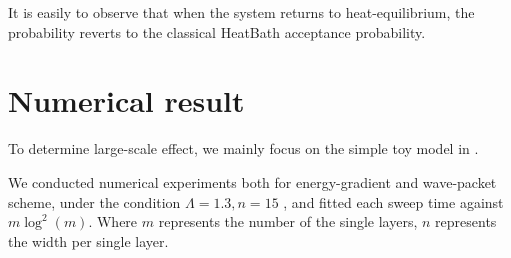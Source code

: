 \documentclass[twocolumn,superscriptaddress,english,showpacs,longbibliography]{revtex4-2}
\begin{document}
It is easily to observe that when the system returns to
heat-equilibrium, the probability reverts to the classical HeatBath
acceptance probability.

\section{Numerical result}\label{sec:numerical-result}
To determine large-scale effect, we mainly focus on the simple toy model in .

We conducted numerical experiments both for energy-gradient and wave-packet scheme, under the condition
$\Lambda = 1.3, n = 15$ , and fitted each sweep time against
$m \log^2(m)$. Where $m$ represents the number of the single layers,
$n$ represents the width per single layer.
\end{document}
